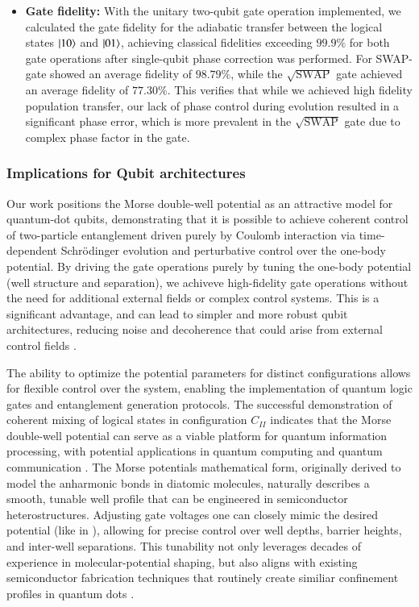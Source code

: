 \documentclass{subfiles}
\begin{document}
\begin{itemize}
    \item \textbf{Gate fidelity:} With the unitary two-qubit gate operation implemented, we calculated the gate fidelity for the adiabatic transfer between the logical states $\ket{10}$ and $\ket{01}$, achieving classical fidelities exceeding $99.9\%$ for both gate operations after single-qubit phase correction was performed. For SWAP-gate showed an average fidelity of $98.79\%$, while the $\sqrt{\text{SWAP}}$ gate achieved an average fidelity of $77.30\%$. This verifies that while we achieved high fidelity population transfer, our lack of phase control during evolution resulted in a significant phase error, which is more prevalent in the $\sqrt{\text{SWAP}}$ gate due to complex phase factor in the gate.
\end{itemize}

\subsubsection*{Implications for Qubit architectures}
Our work positions the Morse double-well potential as an attractive model for quantum-dot qubits, demonstrating that it is possible to achieve coherent control of two-particle entanglement driven purely by Coulomb interaction via time-dependent Schrödinger evolution and perturbative control over the one-body potential. By driving the gate operations purely by tuning the one-body potential (well structure and separation), we achiveve high-fidelity gate operations without the need for additional external fields or complex control systems. This is a significant advantage, and can lead to simpler and more robust qubit architectures, reducing noise and decoherence that could arise from external control fields \cite{petta2005coherent, leinonen2024coulomb}.

The ability to optimize the potential parameters for distinct configurations allows for flexible control over the system, enabling the implementation of quantum logic gates and entanglement generation protocols. The successful demonstration of coherent mixing of logical states in configuration $C_{II}$ indicates that the Morse double-well potential can serve as a viable platform for quantum information processing, with potential applications in quantum computing and quantum communication \cite{nielsen2010quantum}. The Morse potentials mathematical form, originally derived to model the anharmonic bonds in diatomic molecules\cite{morse1929diatomic}, naturally describes a smooth, tunable well profile that can be engineered in semiconductor heterostructures. Adjusting gate voltages one can closely mimic the desired potential (like in \cite{leinonen2024coulomb}), allowing for precise control over well depths, barrier heights, and inter-well separations. This tunability not only leverages decades of experience in molecular-potential shaping, but also aligns with existing semiconductor fabrication techniques that routinely create similiar confinement profiles in quantum dots \cite{jacak2013quantum}.
\end{document}
